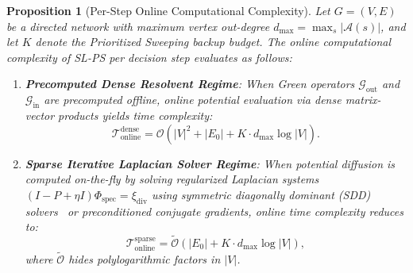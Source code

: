 \documentclass[11pt,a4paper]{article}
\newtheorem{proposition}{Proposition}
\begin{document}
\begin{proposition}[Per-Step Online Computational Complexity]
\label{prop:complexity}
Let $G = (V, E)$ be a directed network with maximum vertex out-degree $d_{\max} = \max_{s} |\mathcal{A}(s)|$, and let $K$ denote the Prioritized Sweeping backup budget. The online computational complexity of SL-PS per decision step evaluates as follows:
\begin{enumerate}
    \item \textbf{Precomputed Dense Resolvent Regime}: When Green operators $\mathcal{G}_{\text{out}}$ and $\mathcal{G}_{\text{in}}$ are precomputed offline, online potential evaluation via dense matrix-vector products yields time complexity:
    \begin{equation}
    \label{eq:complexity_dense}
    \mathcal{T}_{\text{online}}^{\text{dense}} = \mathcal{O}\left( |V|^2 + |E_0| + K \cdot d_{\max} \log |V| \right).
    \end{equation}
    \item \textbf{Sparse Iterative Laplacian Solver Regime}: When potential diffusion is computed on-the-fly by solving regularized Laplacian systems $(I - P + \eta I)\Phi_{\text{spec}} = \xi_{\text{div}}$ using symmetric diagonally dominant (SDD) solvers~\cite{spielman2025sagt} or preconditioned conjugate gradients, online time complexity reduces to:
    \begin{equation}
    \label{eq:complexity_sparse}
    \mathcal{T}_{\text{online}}^{\text{sparse}} = \widetilde{\mathcal{O}}\left( |E_0| + K \cdot d_{\max} \log |V| \right),
    \end{equation}
    where $\widetilde{\mathcal{O}}$ hides polylogarithmic factors in $|V|$.
\end{enumerate}
\end{proposition}
\end{document}
